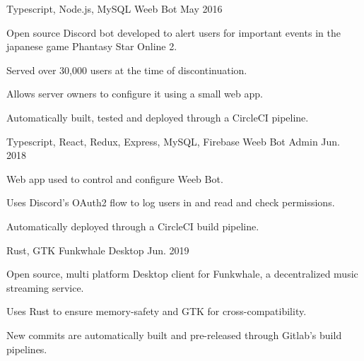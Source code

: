 

\begin{cventries}

  \cventry
    {Typescript, Node.js, MySQL} %
    {Weeb Bot} %
    {}
    {May 2016} %
    {
      \begin{cvitems} %
        \item {Open source Discord bot developed to alert users for important events in the japanese game Phantasy Star Online 2.}
        \item {Served over 30,000 users at the time of discontinuation.}
        \item {Allows server owners to configure it using a small web app.}
        \item {Automatically built, tested and deployed through a CircleCI pipeline.}
      \end{cvitems}
    }

  \cventry
    {Typescript, React, Redux, Express, MySQL, Firebase} %
    {Weeb Bot Admin} %
    {}
    {Jun. 2018} %
    {
      \begin{cvitems} %
        \item {Web app used to control and configure Weeb Bot.}
        \item {Uses Discord's OAuth2 flow to log users in and read and check permissions.}
        \item {Automatically deployed through a CircleCI build pipeline.}
      \end{cvitems}
    }
    
  \cventry
    {Rust, GTK} %
    {Funkwhale Desktop} %
    {}
    {Jun. 2019} %
    {
      \begin{cvitems} %
        \item {Open source, multi platform Desktop client for Funkwhale, a decentralized music streaming service.}
        \item {Uses Rust to ensure memory-safety and GTK for cross-compatibility.}
        \item {New commits are automatically built and pre-released through Gitlab's build pipelines.}
      \end{cvitems}
    }

\end{cventries}
